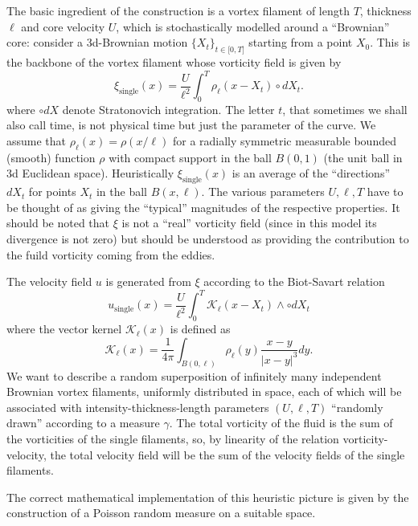 \documentclass[11pt]{preprint}
\begin{document}
The basic ingredient of the construction is a vortex filament of length $T$,
thickness $\ell$ and core velocity $U$, which is stochastically modelled
around a ``Brownian'' core: consider a 3d-Brownian motion $\{X_{t}%
\}_{t\in\lbrack0,T]}$ starting from a point $X_{0}$. This is the backbone of
the vortex filament whose vorticity field is given by
\begin{equation}
\xi_{\text{single}}(x)=\frac{U}{\ell^{2}}\int_{0}^{T}\rho_{\ell}(x-X_{t})
\circ dX_{t}.
\end{equation}
where $\circ dX$ denote Stratonovich integration. The letter $t$, that
sometimes we shall also call time, is not physical time but just the parameter
of the curve. We assume that $\rho_{\ell}(x)=\rho(x/\ell)$ for a radially
symmetric measurable bounded (smooth) function $\rho$ with compact support in
the ball $B(0,1)$ (the unit ball in 3d Euclidean space). Heuristically
$\xi_{\text{single}}(x)$ is an average of the ``directions'' $dX_{t}$ for
points $X_{t}$ in the ball $B(x,\ell)$. The various parameters $U,\ell,T$ have
to be thought of as giving the ``typical'' magnitudes of the respective
properties. It should be noted that $\xi$ is not a ``real'' vorticity field (since in this model its divergence is not zero) but should be understood as providing the contribution to the fuild vorticity coming from the eddies.

The velocity field $u$ is generated from $\xi$ according to the Biot-Savart
relation
\begin{equation}
u_{\text{single}}(x)=\frac{U}{\ell^{2}}\int_{0}^{T}\mathcal{K}_{\ell}(x-X_{t}%
)\wedge\circ dX_{t}%
\end{equation}
where the vector kernel $\mathcal{K}_{\ell}(x)$ is defined as
\begin{equation}
\mathcal{K}_{\ell}(x)=\frac{1}{4\pi}\int_{B(0,\ell)}\rho_{\ell}(y)\frac{x-y}{|x-y|^{3}%
}dy.
\end{equation}
We want to describe a random superposition of infinitely many independent
Brownian vortex filaments, uniformly distributed in space, each of which will
be associated with intensity-thickness-length parameters $(U,\ell,T)$
``randomly drawn'' according to a measure $\gamma$. The total vorticity of the
fluid is the sum of the vorticities of the single filaments, so, by linearity of
the relation vorticity-velocity, the total velocity field will be the sum of
the velocity fields of the single filaments.

The correct mathematical implementation of this heuristic picture is given by
the construction of a Poisson random measure on a suitable space.
\end{document}
